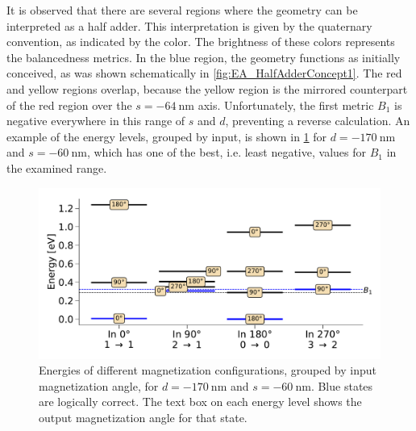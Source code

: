 \documentclass[twocolumn]{phdsymp}
\begin{document}
It is observed that there are several regions where the geometry can be interpreted as a half adder. This interpretation is given by the quaternary convention, as indicated by the color. The brightness of these colors represents the balancedness metrics. In the blue region, the geometry functions as initially conceived, as was shown schematically in \cref{fig:EA_HalfAdderConcept1}. The red and yellow regions overlap, because the yellow region is the mirrored counterpart of the red region over the $s=\SI{-64}{\nano\metre}$ axis. Unfortunately, the first metric $B_1$ is negative everywhere in this range of $s$ and $d$, preventing a reverse calculation. An example of the energy levels, grouped by input, is shown in \cref{fig:EA_HalfAdderLevels1} for $d=\SI{-170}{\nano\metre}$ and $s=\SI{-60}{\nano\metre}$, which has one of the best, i.e. least negative, values for $B_1$ in the examined range. \par
\begin{figure}
    \centering
    \includegraphics[width=\columnwidth]{Figures/table(d170,s-60)_energylevels_largerfont.pdf}
    \caption{Energies of different magnetization configurations, grouped by input magnetization angle, for $d=\SI{-170}{\nano\metre}$ and $s=\SI{-60}{\nano\metre}$. Blue states are logically correct. The text box on each energy level shows the output magnetization angle for that state.}
    \label{fig:EA_HalfAdderLevels1}
\end{figure}
\end{document}
